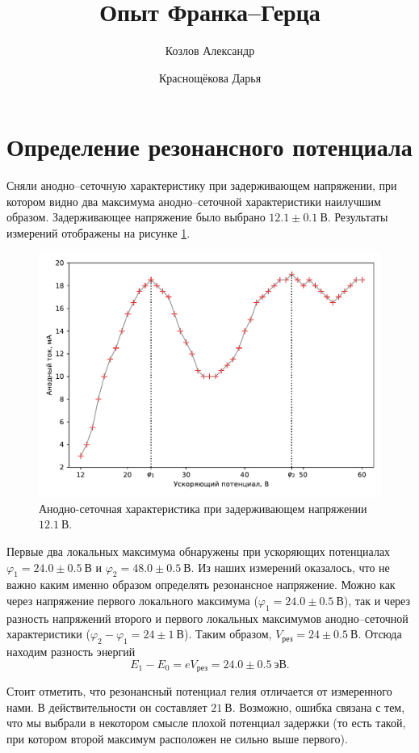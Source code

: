 \documentclass[12pt]{article}
\title{Опыт Франка\---Герца}
\author{Козлов Александр \and Краснощёкова Дарья}
\begin{document}
	\maketitle
	\section{Определение резонансного потенциала}
	Сняли анодно\---сеточную характеристику при задерживающем напряжении, при котором видно два максимума анодно\---сеточной характеристики наилучшим образом. Задерживающее напряжение было выбрано $12.1 \pm 0.1\ \text{В}$. Результаты измерений отображены на рисунке \ref{fig:figure1}.
	\begin{figure}[htbp]
		\centering
		\includegraphics[width=\linewidth]{../plots/1}
		\caption{Анодно-сеточная характеристика при задерживающем напряжении $12.1\ \text{В}$.}
		\label{fig:figure1}
	\end{figure}
	Первые два локальных максимума обнаружены при ускоряющих потенциалах $\varphi_1=24.0\pm0.5\ \text{В}$ и $\varphi_2=48.0\pm0.5\ \text{В}$. Из наших измерений оказалось, что не важно каким именно образом определять резонансное напряжение. Можно как через напряжение первого локального максимума ($\varphi_1=24.0\pm0.5\ \text{В}$), так и через разность напряжений второго и первого локальных максимумов анодно\---сеточной характеристики ($\varphi_2 - \varphi_1 = 24\pm1\ \text{В}$). Таким образом, $V_\text{рез} = 24\pm0.5\ \text{В}$. Отсюда находим разность энергий
	\begin{equation}
			E_1 - E_0 = eV_\text{рез} = 24.0\pm0.5\ \text{эВ}.
	\end{equation}
	\par Стоит отметить, что резонансный потенциал гелия отличается от измеренного нами. В действительности он составляет $21\ \text{В}$. Возможно, ошибка связана с тем, что мы выбрали в некотором смысле плохой потенциал задержки (то есть такой, при котором второй максимум расположен не сильно выше первого). 
\end{document}
